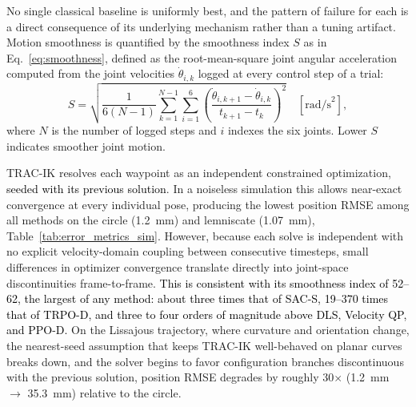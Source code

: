 \documentclass[preprint,12pt]{elsarticle}
\begin{document}
No single classical baseline is uniformly best, and the pattern of
failure for each is a direct consequence of its underlying mechanism
rather than a tuning artifact. {\color{black}Motion smoothness is quantified by the smoothness index $S$ as in Eq.~\eqref{eq:smoothness}, defined as the root-mean-square joint angular acceleration computed from the joint velocities $\dot{\theta}_{i,k}$ logged at every control step of a trial:
\begin{equation}
S = \sqrt{\frac{1}{6(N-1)}\sum_{k=1}^{N-1}\sum_{i=1}^{6}\left(\frac{\dot{\theta}_{i,k+1}-\dot{\theta}_{i,k}}{t_{k+1}-t_k}\right)^{2}}\quad [\text{rad/s}^{2}],
\label{eq:smoothness}
\end{equation}
where $N$ is the number of logged steps and $i$ indexes the six joints. Lower $S$ indicates smoother joint motion.}

TRAC-IK resolves each waypoint as an independent constrained optimization, \textcolor{black}{seeded with its previous solution}. In a noiseless
simulation this allows near-exact convergence at every individual pose,
producing the lowest position RMSE among all methods on the circle
(1.2~mm) and lemniscate (1.07~mm), Table~\ref{tab:error_metrics_sim}. However, because each solve is independent with no explicit velocity-domain coupling between consecutive timesteps, small differences in optimizer convergence translate directly into joint-space discontinuities frame-to-frame. \textcolor{black}{This is consistent with its smoothness index of 52--62, the largest of any method: about three times that of SAC-S, 19--370 times that of TRPO-D, and three to four orders of magnitude above DLS, Velocity QP, and PPO-D.} On the Lissajous trajectory, where curvature and orientation change, the nearest-seed assumption that keeps TRAC-IK well-behaved on planar curves breaks down, and the solver begins to favor configuration branches discontinuous with the previous solution, position RMSE degrades by roughly 30$\times$ (1.2~mm $\rightarrow$ 35.3~mm) relative to the circle.
\end{document}
